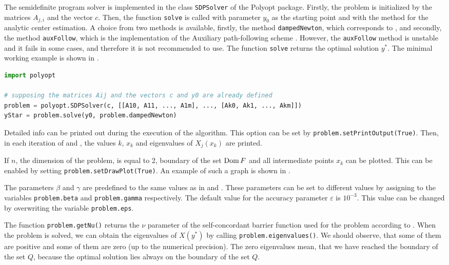The semidefinite program solver is implemented in the class \texttt{SDPSolver} of the Polyopt package. Firstly, the problem is initialized by the matrices $A_{j,i}$ and the vector $c$.
Then, the function \texttt{solve} is called with parameter $y_0$ as the starting point and with the method for the analytic center estimation.
A choice from two methods is available, firstly, the method \texttt{dampedNewton}, which corresponds to , and secondly, the method \texttt{auxFollow}, which is the implementation of the Auxiliary path-following scheme \cite{Nesterov-2004}. 
However, the \texttt{auxFollow} method is unstable and it fails in some cases, and therefore it is not recommended to use.
The function \texttt{solve} returns the optimal solution $y^*$.
The minimal working example is shown in .
\begin{lstlisting}[language=python, caption={Typical use of the class \texttt{SDPSolver} of the Polyopt package.}, labellis={SDP:imp:usage}]
import polyopt

# supposing the matrices Aij and the vectors c and y0 are already defined
problem = polyopt.SDPSolver(c, [[A10, A11, ..., A1m], ..., [Ak0, Ak1, ..., Akm]])
yStar = problem.solve(y0, problem.dampedNewton)
\end{lstlisting}

Detailed info can be printed out during the execution of the algorithm.
This option can be set by \texttt{problem.setPrintOutput(True)}.
Then, in each iteration of  and , the values $k$, $x_k$ and eigenvalues of $X_j(x_k)$ are printed.

If $n$, the dimension of the problem, is equal to 2, boundary of the set $\operatorname{Dom} F$  and all intermediate points $x_k$ can be plotted.
This can be enabled by setting \texttt{problem.setDrawPlot(True)}.
An example of such a graph is shown in .

The parameters $\beta$ and $\gamma$ are predefined to the same values as in  and .
These parameters can be set to different values by assigning to the variables \texttt{problem.beta} and \texttt{problem.gamma} respectively.
The default value for the accuracy parameter $\varepsilon$ is $10^{-3}$.
This value can be changed by overwriting the variable \texttt{problem.eps}.

The function \texttt{problem.getNu()} returns the $\nu$ parameter of the self-concordant barrier function used for the problem according to .
When the problem is solved, we can obtain the eigenvalues of $X(y^*)$ by calling \texttt{problem.eigenvalues()}.
We should observe, that some of them are positive and some of them are zero (up to the numerical precision).
The zero eigenvalues mean, that we have reached the boundary of the set $Q$, because the optimal solution lies always on the boundary of the set $Q$.

